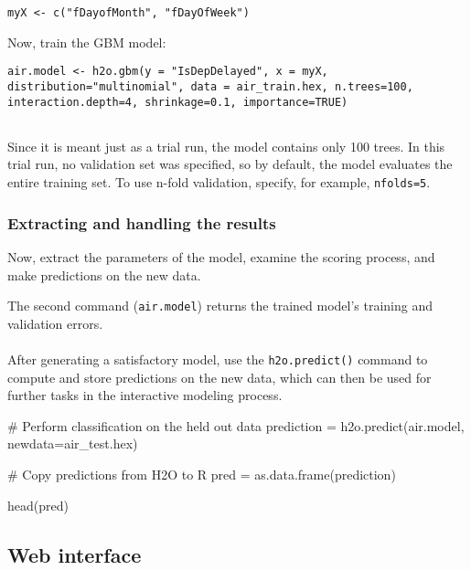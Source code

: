 \documentclass{article}[11pt]
\begin{document}
{\begin{lstlisting}[breaklines,basicstyle=\ttfamily]
myX <- c("fDayofMonth", "fDayOfWeek")

\end{lstlisting}

Now, train the GBM model:

\begin{lstlisting}[breaklines,basicstyle=\ttfamily]
air.model <- h2o.gbm(y = "IsDepDelayed", x = myX, distribution="multinomial", data = air_train.hex, n.trees=100, interaction.depth=4, shrinkage=0.1, importance=TRUE)
                   
\end{lstlisting}

\noindent
Since it is meant just as a trial run, the model contains only 100 trees. In this trial run, no validation set was specified, so by default, the model evaluates the entire training set.  To use n-fold validation, specify, for example, \texttt{nfolds=5}. 

\subsubsection{Extracting and handling the results}  

Now, extract the parameters of the model, examine the scoring process, and make predictions on the new data.

\noindent
The second command ({\texttt{air.model}}) returns the trained model's training and validation errors. 
\\
\\
After generating a satisfactory model, use the \texttt{h2o.predict()} command to compute and store predictions on the new data, which can then be used for further tasks in the interactive modeling process.
\begin{spverbatim}
# Perform classification on the held out data
prediction = h2o.predict(air.model, newdata=air_test.hex)

# Copy predictions from H2O to R
pred = as.data.frame(prediction)

head(pred)

\end{spverbatim}


\subsection{Web interface} 

}
\end{document}
